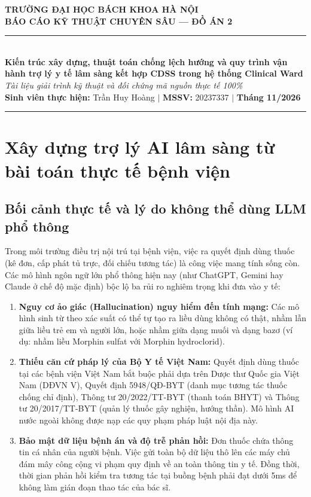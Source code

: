 \documentclass[12pt,a4paper]{article}
\begin{document}
\begin{center}
    {\large \textbf{TRƯỜNG ĐẠI HỌC BÁCH KHOA HÀ NỘI}}\\[0.25em]
    {\normalsize \textbf{BÁO CÁO KỸ THUẬT CHUYÊN SÂU --- ĐỒ ÁN 2}}\\[0.6em]
    \rule{\textwidth}{1.2pt}\\[0.6em]
    {\Large \textbf{Kiến trúc xây dựng, thuật toán chống lệch hướng và quy trình vận hành trợ lý y tế lâm sàng kết hợp CDSS trong hệ thống Clinical Ward}}\\[0.4em]
    {\normalsize \textit{Tài liệu giải trình kỹ thuật và đối chứng mã nguồn thực tế 100\%}}\\[0.3em]
    {\small \textbf{Sinh viên thực hiện:} Trần Huy Hoàng \quad $\vert$ \quad \textbf{MSSV:} 20237337 \quad $\vert$ \quad \textbf{Tháng 11/2026}}
\end{center}

\vspace{0.3em}
\rule{\textwidth}{0.4pt}

\section{Xây dựng trợ lý AI lâm sàng từ bài toán thực tế bệnh viện}

\subsection{Bối cảnh thực tế và lý do không thể dùng LLM phổ thông}
Trong môi trường điều trị nội trú tại bệnh viện, việc ra quyết định dùng thuốc (kê đơn, cấp phát tủ trực, đối chiếu tương tác) là công việc mang tính sống còn. Các mô hình ngôn ngữ lớn phổ thông hiện nay (như ChatGPT, Gemini hay Claude ở chế độ mặc định) bộc lộ ba rủi ro nghiêm trọng khi đưa vào y tế:
\begin{enumerate}[leftmargin=1.5em]
    \item \textbf{Nguy cơ ảo giác (Hallucination) nguy hiểm đến tính mạng:} Các mô hình sinh từ theo xác suất có thể tự tạo ra liều dùng không có thật, nhầm lẫn giữa liều trẻ em và người lớn, hoặc nhầm giữa dạng muối và dạng bazơ (ví dụ: nhầm liều Morphin sulfat với Morphin hydroclorid).
    \item \textbf{Thiếu căn cứ pháp lý của Bộ Y tế Việt Nam:} Quyết định dùng thuốc tại các bệnh viện Việt Nam bắt buộc phải dựa trên Dược thư Quốc gia Việt Nam (DĐVN V), Quyết định 5948/QĐ-BYT (danh mục tương tác thuốc chống chỉ định), Thông tư 20/2022/TT-BYT (thanh toán BHYT) và Thông tư 20/2017/TT-BYT (quản lý thuốc gây nghiện, hướng thần). Mô hình AI nước ngoài không được nạp các quy phạm pháp luật nội địa này.
    \item \textbf{Bảo mật dữ liệu bệnh án và độ trễ phản hồi:} Đơn thuốc chứa thông tin cá nhân của người bệnh. Việc gửi toàn bộ dữ liệu thô lên các máy chủ đám mây công cộng vi phạm quy định về an toàn thông tin y tế. Đồng thời, thời gian phản hồi kiểm tra tương tác tại buồng bệnh phải đạt dưới 5ms để không làm gián đoạn thao tác của bác sĩ.
\end{enumerate}
\end{document}

